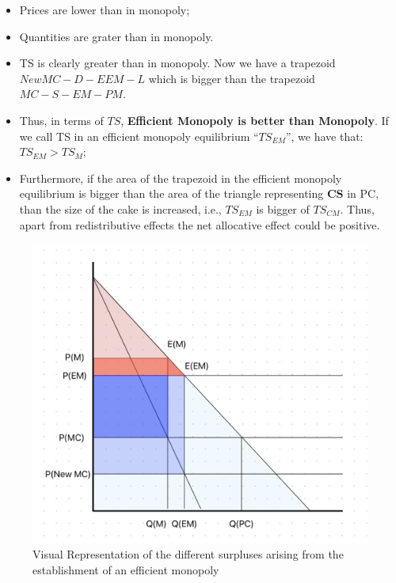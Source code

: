             \begin{itemize}
                \item Prices are lower than in monopoly; 
                \item Quantities are grater than in monopoly.
                \item TS is clearly greater than in monopoly. Now we have a trapezoid $NewMC-D-EEM-L$ which is bigger than the trapezoid $MC-S-EM-PM$.
                \item Thus, in terms of $TS$, \textbf{Efficient Monopoly is better than Monopoly}. If we call TS in an efficient monopoly equilibrium “$TS_{EM}$”, we have that: $TS_{EM} > TS_{M}$;
                \item Furthermore, if the area of the trapezoid in the efficient monopoly equilibrium is bigger than the area of the triangle representing \textcolor{BrickRed}{\textbf{CS}} in PC, than the size of the cake is increased, i.e., $TS_{EM}$ is bigger of $TS_{CM}$. Thus, apart from redistributive effects the net allocative effect could be positive.
            \end{itemize}

            \begin{figure}[h]
                \centering
                \includegraphics[width=0.66\linewidth]{graphics/EfficientMonopoly.png}
                \caption{Visual Representation of the different surpluses arising from the establishment of an efficient monopoly}
                \label{fig:efficient_monopoly}
            \end{figure}

